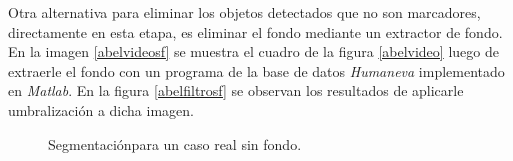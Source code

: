 Otra alternativa para eliminar los objetos detectados que no son marcadores, directamente en esta etapa, es eliminar el fondo mediante un extractor de fondo. En la imagen \ref{abelvideosf} se muestra el cuadro de la figura \ref{abelvideo} luego de extraerle el fondo con un programa de la base de datos \emph{Humaneva}\cite{humanevaBase} implementado en \emph{Matlab}. En la figura \ref{abelfiltrosf} se observan los resultados de aplicarle umbralización a dicha imagen.

\begin{figure}[H]
        \centering
        \hspace{5 mm}
  \caption{Segmentaciónpara un caso real sin fondo.}
      \label{ejemploabelsf}
\end{figure}

